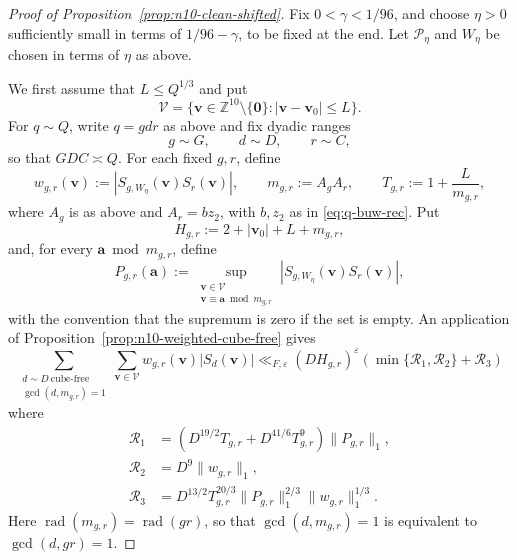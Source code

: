 \documentclass[a4paper,11pt, twoside,reqno]{amsart}
\theoremstyle{plain}
\theoremstyle{definition}
\theoremstyle{remark}
\newcommand{\bfa}{\bm{a}}
\newcommand{\bfv}{\bm{v}}
\newcommand{\ZZ}{\mathbb{Z}}
\newcommand{\ve}{\varepsilon}
\renewcommand{\leq}{\leqslant}
\newcommand{\rad}{\operatorname{rad}}
\numberwithin{equation}{section}
\begin{document}
\begin{proof}[Proof of Proposition~\ref{prop:n10-clean-shifted}]
Fix $0<\gamma<1/96$, and choose $\eta>0$ sufficiently
small in terms of $1/96-\gamma$, to be fixed at the end.
Let $\mathcal P_\eta$ and $W_\eta$
be chosen in terms of $\eta$ as above.

We first assume that $L\leq Q^{1/3}$ and put
\[
\mathcal V
=
\{\bfv\in\ZZ^{10}\setminus\{\bm0\}:
|\bfv-\bfv_0|\leq L\}.
\]
For $q\sim Q$, write $q=gdr$ as above and fix dyadic ranges
\[
g\sim G,\qquad d\sim D,\qquad r\sim C,
\]
so that $GDC\asymp Q$.
For each fixed $g,r$, define
\[
w_{g,r}(\bfv)
:=
|S_{g,W_\eta}(\bfv)S_r(\bfv)|,
\qquad
m_{g,r}:=A_gA_r,
\qquad
T_{g,r}:=1+\frac{L}{m_{g,r}},
\]
where $A_g$ is as above and $A_r=bz_2$, with $b,z_2$
as in \eqref{eq:q-buw-rec}. Put
\[
H_{g,r}:=2+|\bfv_0|+L+m_{g,r},
\]
and, for every $\bfa\bmod m_{g,r}$, define
\[
P_{g,r}(\bfa)
:=
\sup_{\substack{\bfv\in\mathcal V\\
\bfv\equiv\bfa\bmod m_{g,r}}}
|S_{g,W_\eta}(\bfv)S_r(\bfv)|,
\]
with the convention that the supremum is zero if the
set is empty.
An application of Proposition~\ref{prop:n10-weighted-cube-free}
gives
\begin{equation}
\label{eq:n10-cube-free-applied}
\sum_{\substack{d\sim D\ \mathrm{cube\text{-}free}\\
\gcd(d,m_{g,r})=1}}
\sum_{\bfv\in\mathcal V}
w_{g,r}(\bfv)|S_d(\bfv)|
\ll_{F,\ve} (DH_{g,r})^\ve \left(\min\{\mathcal R_1, \mathcal R_2\} + \mathcal R_3\right)
\end{equation}
where
\begin{equation*}
\begin{split}
\mathcal R_1
&= (D^{19/2}T_{g,r}+D^{41/6}T_{g,r}^{9}) \|P_{g,r}\|_1, \\
\mathcal R_2
&= D^9\|w_{g,r}\|_1, \\
\mathcal R_3
&= D^{13/2}T_{g,r}^{20/3}
\|P_{g,r}\|_1^{2/3}
\|w_{g,r}\|_1^{1/3}.
\end{split}
\end{equation*}
Here $\rad(m_{g,r})=\rad(gr)$, so that
$\gcd(d,m_{g,r})=1$ is equivalent to $\gcd(d,gr)=1$.


\end{proof}
\end{document}
